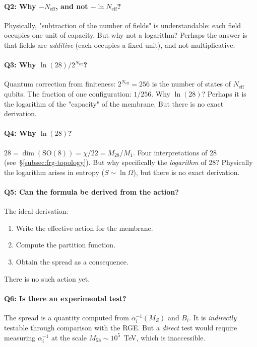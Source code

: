 \documentclass[11pt,a4paper]{article}
\newcommand{\SO}{\ensuremath{\mathrm{SO}}}
\theoremstyle{definition}
\begin{document}
\paragraph{Q2: Why $- N_{\text{eff}}$, and not $-\ln N_{\text{eff}}$?}
Physically, "subtraction of the number of fields" is understandable: each field
occupies one unit of capacity. But why not a logarithm?
Perhaps the answer is that fields are \emph{additive} (each
occupies a fixed unit), and not multiplicative.

\paragraph{Q3: Why $\ln(28)/2^{N_{\text{eff}}}$?}
Quantum correction from finiteness: $2^{N_{\text{eff}}} = 256$
is the number of states of $N_{\text{eff}}$ qubits. The fraction
of one configuration: $1/256$. Why $\ln(28)$? Perhaps it is the
logarithm of the "capacity" of the membrane. But there is no exact derivation.

\paragraph{Q4: Why \texorpdfstring{$\ln(28)$}{(28)}?}
$28 = \dim(\SO(8)) = \chi/22 = M_{28}/M_1$.
Four interpretations of 28 (see~\S\ref{subsec:frg-topology}).
But why specifically the \emph{logarithm} of 28? Physically the logarithm
arises in entropy ($S \sim \ln \Omega$), but there is no exact
derivation.

\paragraph{Q5: Can the formula be derived from the action?}
The ideal derivation:
\begin{enumerate}
    \item Write the effective action for the membrane.
    \item Compute the partition function.
    \item Obtain the spread as a consequence.
\end{enumerate}
There is no such action yet.

\paragraph{Q6: Is there an experimental test?}
The spread is a quantity computed from $\alpha_i^{-1}(M_Z)$
and $B_i$. It is \emph{indirectly} testable through comparison
with the RGE. But a \emph{direct} test would require measuring
$\alpha_i^{-1}$ at the scale $M_{58} \sim 10^5$~TeV,
which is inaccessible.
\end{document}
